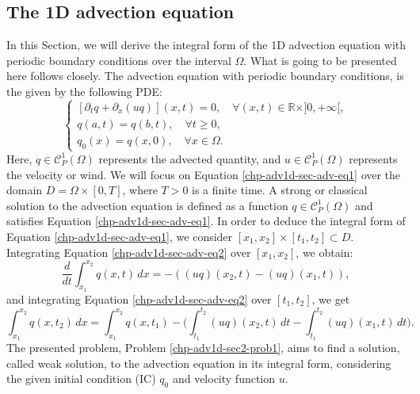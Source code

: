 \subsection{The 1D advection equation}
In this Section, we will derive the integral form of the 1D advection equation with periodic boundary conditions over the interval $\Omega$.
What is going to be presented here follows \citet{leveque:1990,leveque:2002} closely.
The advection equation with periodic boundary conditions, is the given by the following PDE:
\begin{equation}
	\label{chp-adv1d-sec-adv-eq1}
	\begin{cases}
		[{\partial_t q} + {\partial_x (uq)}](x, t)
		= 0, \quad \forall (x,t) \in \mathbb{R}\times ]0, +\infty[,\\
		{q}(a, t) = {q}(b, t), \quad \forall t\geq 0,\\
		q_0(x) = q(x,0), \quad \forall x \in \Omega.
	\end{cases}
\end{equation}
Here, $q \in \mathcal{C}_P^1{(\Omega)}$ represents the advected quantity, and $u \in \mathcal{C}_P^1{(\Omega)}$ represents the velocity or wind.
We will focus on Equation \eqref{chp-adv1d-sec-adv-eq1} over the domain $D = \Omega\times[0,T]$, where $T>0$ is a finite time.
A strong or classical solution to the advection equation is defined as a function ${q}\in\mathcal{C}^1_P(\Omega)$ 
and satisfies Equation \eqref{chp-adv1d-sec-adv-eq1}.
In order to deduce the integral form of Equation \eqref{chp-adv1d-sec-adv-eq1}, we consider
$[x_1, x_2]\times[t_1,t_2]\subset D$. 
Integrating Equation \eqref{chp-adv1d-sec-adv-eq2} over $[x_1, x_2]$, we obtain:
\begin{equation}
    \label{chp-adv1d-sec-adv-eq2}
	\frac{d}{dt} \int_{x_1}^{x_2} q(x,t) \,dx =  
	-({(uq)}(x_2,t) - {(uq)}(x_1,t)) ,
\end{equation}
and integrating Equation \eqref{chp-adv1d-sec-adv-eq2} over $[t_1,t_2]$, we get
\begin{equation}
    \label{chp-adv1d-sec-adv-eq3}
    \int_{x_1}^{x_2} q(x,t_2) \,dx=  \int_{x_1}^{x_2} q(x,t_1)
	-\bigg( \int_{t_1}^{t_2} 
	{(uq)}(x_2, t) \,dt - 
	\int_{t_1}^{t_2}{(uq)}(x_1, t) \,dt \bigg).
\end{equation}
The presented problem, Problem \ref{chp-adv1d-sec2-prob1}, aims to find a solution, called weak solution, to the advection equation
in its integral form, considering the given initial condition (IC) ${q}_0$ and velocity function $u$.

